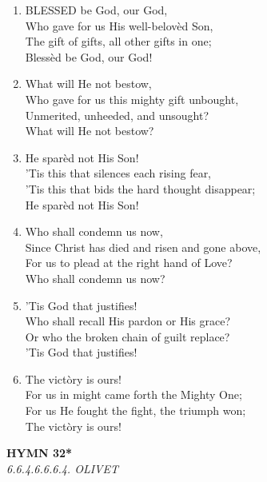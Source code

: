 \documentclass[11pt,a4paper]{article}
\begin{document}
\begin{enumerate}
    \item BLESSED be God, our God, \\
        Who gave for us His well-belov\`ed Son, \\
        The gift of gifts, all other gifts in one; \\
        Bless\`ed be God, our God!

    \item What will He not bestow, \\
        Who gave for us this mighty gift unbought, \\
        Unmerited, unheeded, and unsought? \\
        What will He not bestow?

    \item He spar\`ed not His Son! \\
        'Tis this that silences each rising fear, \\
        'Tis this that bids the hard thought disappear; \\
        He spar\`ed not His Son!

    \item Who shall condemn us now, \\
        Since Christ has died and risen and gone above, \\
        For us to plead at the right hand of Love? \\
        Who shall condemn us now?

    \item 'Tis God that justifies! \\
        Who shall recall His pardon or His grace? \\
        Or who the broken chain of guilt replace? \\
        'Tis God that justifies!

    \item The vict\`ory is ours! \\
        For us in might came forth the Mighty One; \\
        For us He fought the fight, the triumph won; \\
        The vict\`ory is ours!

\end{enumerate}

\newpage
\begin{center}
    {\Large \textbf{HYMN 32*}}
    \\
    \textit{6.6.4.6.6.6.4. OLIVET}
\end{center}
\vspace{1em}
\end{document}
